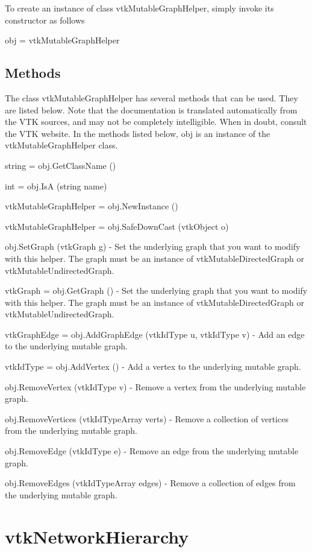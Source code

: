 To create an instance of class vtk\-Mutable\-Graph\-Helper, simply invoke its constructor as follows \begin{DoxyVerb}  obj = vtkMutableGraphHelper
\end{DoxyVerb}
 \hypertarget{vtkwidgets_vtkxyplotwidget_Methods}{}\subsection{Methods}\label{vtkwidgets_vtkxyplotwidget_Methods}
The class vtk\-Mutable\-Graph\-Helper has several methods that can be used. They are listed below. Note that the documentation is translated automatically from the V\-T\-K sources, and may not be completely intelligible. When in doubt, consult the V\-T\-K website. In the methods listed below, {\ttfamily obj} is an instance of the vtk\-Mutable\-Graph\-Helper class. 
\begin{DoxyItemize}
\item {\ttfamily string = obj.\-Get\-Class\-Name ()}  
\item {\ttfamily int = obj.\-Is\-A (string name)}  
\item {\ttfamily vtk\-Mutable\-Graph\-Helper = obj.\-New\-Instance ()}  
\item {\ttfamily vtk\-Mutable\-Graph\-Helper = obj.\-Safe\-Down\-Cast (vtk\-Object o)}  
\item {\ttfamily obj.\-Set\-Graph (vtk\-Graph g)} -\/ Set the underlying graph that you want to modify with this helper. The graph must be an instance of vtk\-Mutable\-Directed\-Graph or vtk\-Mutable\-Undirected\-Graph.  
\item {\ttfamily vtk\-Graph = obj.\-Get\-Graph ()} -\/ Set the underlying graph that you want to modify with this helper. The graph must be an instance of vtk\-Mutable\-Directed\-Graph or vtk\-Mutable\-Undirected\-Graph.  
\item {\ttfamily vtk\-Graph\-Edge = obj.\-Add\-Graph\-Edge (vtk\-Id\-Type u, vtk\-Id\-Type v)} -\/ Add an edge to the underlying mutable graph.  
\item {\ttfamily vtk\-Id\-Type = obj.\-Add\-Vertex ()} -\/ Add a vertex to the underlying mutable graph.  
\item {\ttfamily obj.\-Remove\-Vertex (vtk\-Id\-Type v)} -\/ Remove a vertex from the underlying mutable graph.  
\item {\ttfamily obj.\-Remove\-Vertices (vtk\-Id\-Type\-Array verts)} -\/ Remove a collection of vertices from the underlying mutable graph.  
\item {\ttfamily obj.\-Remove\-Edge (vtk\-Id\-Type e)} -\/ Remove an edge from the underlying mutable graph.  
\item {\ttfamily obj.\-Remove\-Edges (vtk\-Id\-Type\-Array edges)} -\/ Remove a collection of edges from the underlying mutable graph.  
\end{DoxyItemize}\hypertarget{vtkinfovis_vtknetworkhierarchy}{}\section{vtk\-Network\-Hierarchy}\label{vtkinfovis_vtknetworkhierarchy}
